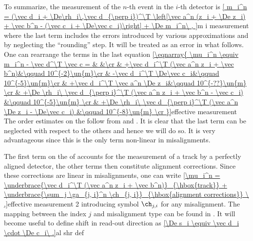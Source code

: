 
To summarize, the measurement of the $n$-th event in the $i$-th detector is
\eqref{
m_i^n = (\vec d_i + \De\rh_i\,\vec d_{\perp i})^\T \left[\vec a^n (z_i + \De z_i) + \vec b^n - (\vec c_i + \De\vec c_i)\right] + \De m_i^n\ ,
}{m i measurement}
where the last term includes the errors introduced by various approximations and by neglecting the ``rounding'' step. It will be treated as an error in what follows. One can rearrange the terms in the last equation
\eqref{\eqnarray{
\mu_i^n \equiv m_i^n - \vec d^\T \vec c = & &\cr
& +\vec d_i^\T (\vec a^n z_i + \vec b^n)&\qquad 10^{-2}\un{m}\cr
& -\vec d_i^\T \De\vec c_i&\qquad 10^{-5}\un{m}\cr
& +\vec d_i^\T \vec a^n \De z_i&\qquad 10^{-??}\un{m} \cr
& +\De \rh_i\ \vec d_{\perp i}^\T (\vec a^n z_i + \vec b^n - \vec c_i) &\qquad 10^{-5}\un{m} \cr
& +\De \rh_i\ \vec d_{\perp i}^\T (\vec a^n \De z_i - \De\vec c_i) &\qquad 10^{-8}\un{m} \cr
}}{effective measurement}
The order estimates on the \rhs{} follow from  and . It is clear that the last term can be neglected with respect to the others and hence we will do so. It is very advantageous since this is the only term non-linear in misalignments. 

The first term on the \rhs{} of  accounts for the measurement of a track by a perfectly aligned detector, the other terms then constitute alignment corrections. Since these corrections are linear in misalignments, one can write
\eqref{\mu_i^n =
\underbrace{\vec d_i^\T (\vec a^n z_i + \vec b^n)}_{\hbox{track}}
+
\underbrace{\sum_j \ga_{j, i}^n \ch_{j, i}}_{\hbox{alignment corrections}}
\ ,}{effective measurement 2}
introducing symbol $\ch_{j, i}$ for any misalignment. The mapping between the index $j$ and misalignment type can be found in . It will become useful to define shift in read-out direction as
\eqref{\De s_i \equiv \vec d_i \cdot \De c_i\ .}{al shr def}


